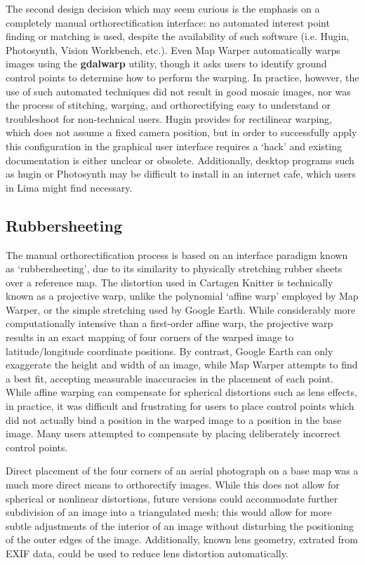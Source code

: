 \documentclass[11pt,oneside,notitlepage]{report}
\begin{document}
{{The second design decision which may seem curious is the emphasis on a completely manual orthorectification interface: no automated interest point finding or matching is used, despite the availability of such software (i.e. Hugin, Photosynth, Vision Workbench, etc.). Even Map Warper automatically warps images using the \textbf{gdalwarp} utility, though it asks users to identify ground control points to determine how to perform the warping. In practice, however, the use of such automated techniques did not result in good mosaic images, nor was the process of stitching, warping, and orthorectifying easy to understand or troubleshoot for non-technical users. Hugin provides for rectilinear warping, which does not assume a fixed camera position, but in order to successfully apply this configuration in the graphical user interface requires a `hack' and existing documentation is either unclear or obsolete. Additionally, desktop programs such as hugin or Photosynth may be difficult to install in an internet cafe, which users in Lima might find necessary.

\subsection{Rubbersheeting}
\label{subsec:rubbersheeting}

The manual orthorectification process is based on an interface paradigm known as `rubbersheeting', due to its similarity to physically stretching rubber sheets over a reference map. The distortion used in Cartagen Knitter is technically known as a projective warp, unlike the polynomial `affine warp' employed by Map Warper, or the simple stretching used by Google Earth. While considerably more computationally intensive than a first-order affine warp, the projective warp results in an exact mapping of four corners of the warped image to latitude/longitude coordinate positions. By contrast, Google Earth can only exaggerate the height and width of an image, while Map Warper attempts to find a best fit, accepting measurable inaccuracies in the placement of each point. While affine warping can compensate for spherical distortions such as lens effects, in practice, it was difficult and frustrating for users to place control points which did not actually bind a position in the warped image to a position in the base image. Many users attempted to compensate by placing deliberately incorrect control points. \cite{bentley2010warping} 

Direct placement of the four corners of an aerial photograph on a base map was a much more direct means to orthorectify images. While this does not allow for spherical or nonlinear distortions, future versions could accommodate further subdivision of an image into a triangulated mesh; this would allow for more subtle adjustments of the interior of an image without disturbing the positioning of the outer edges of the image. Additionally, known lens geometry, extrated from \ac{EXIF} data, could be used to reduce lens distortion automatically.  

}}
\end{document}
